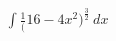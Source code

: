 \documentclass[preview]{standalone}
\begin{document}
\begin{align*}
\int \frac{1}({16-4x^2)^\frac{3}{2}} \ dx
\end{align*}
\end{document}
